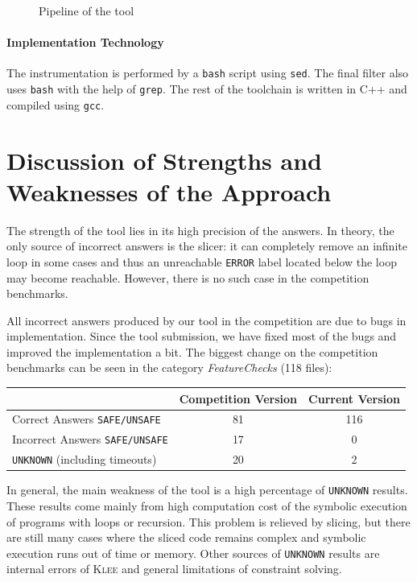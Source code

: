 \documentclass[10pt]{llncs}
\begin{document}
\begin{figure}[tb]
\begin{center}

\end{center}
  \caption{Pipeline of the tool}
\label{fig:pipeline}
\end{figure}

\paragraph{Implementation Technology} The instrumentation is performed by a
\texttt{bash} script using \texttt{sed}. The final filter also uses
\texttt{bash} with the help of \texttt{grep}. The rest of the toolchain is
written in C++ and compiled using \texttt{gcc}.


\section{Discussion of Strengths and Weaknesses of the Approach}

The strength of the tool lies in its high precision of the answers. In theory,
the only source of incorrect answers is the slicer: it can completely remove
an infinite loop in some cases and thus an unreachable \texttt{ERROR} label
located below the loop may become reachable. However, there is no such case
in the competition benchmarks. 

All incorrect answers produced by our tool in the competition are due to bugs
in implementation.  Since the tool submission, we have fixed most of the bugs
and improved the implementation a bit. The biggest change on the competition
benchmarks can be seen in the category \emph{FeatureChecks} (118 files):

\begin{center}
  \setlength{\tabcolsep}{3pt}
  \begin{tabular}{|l|c|c|}
    \hline
    & Competition Version & Current Version \\ \hline 
    Correct Answers \texttt{SAFE/UNSAFE} & 81 & 116 \\ \hline
    Incorrect Answers \texttt{SAFE/UNSAFE} & 17 & 0 \\ \hline
    \texttt{UNKNOWN} (including timeouts) & 20 & 2 \\ \hline
  \end{tabular}
\end{center}

In general, the main weakness of the tool is a high percentage of
\texttt{UNKNOWN} results. These results come mainly from high computation
cost of the symbolic execution of programs with loops or recursion. This
problem is relieved by slicing, but there are still many cases where the
sliced code remains complex and symbolic execution runs out of time or
memory. Other sources of \texttt{UNKNOWN} results are internal errors of
\textsc{Klee} and general limitations of constraint solving.
\end{document}
